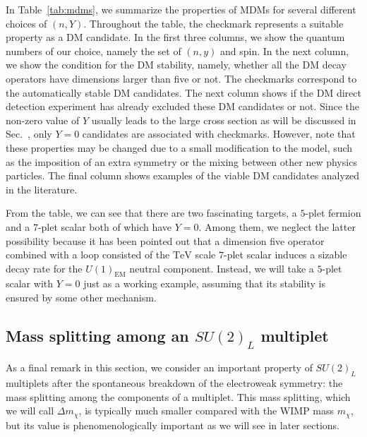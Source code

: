 \documentclass[12pt,twoside,book]{article}
\begin{document}
In Table~\ref{tab:mdms}, we summarize the properties of MDMs for several different choices of $(n, Y)$.
Throughout the table, the checkmark represents a suitable property as a DM candidate.
In the first three columns, we show the quantum numbers of our choice, namely the set of $(n,y)$ and spin.
In the next column, we show the condition for the DM stability, namely, whether all the DM decay operators have dimensions larger than five or not.
The checkmarks correspond to the automatically stable DM candidates.
The next column shows if the DM direct detection experiment has already excluded these DM candidates or not.
Since the non-zero value of $Y$ usually leads to the large cross section as will be discussed in Sec.~, only $Y=0$ candidates are associated with checkmarks.
However, note that these properties may be changed due to a small modification to the model, such as the imposition of an extra symmetry or the mixing between other new physics particles.
The final column shows examples of the viable DM candidates analyzed in the literature.

From the table, we can see that there are two fascinating targets, a $5$-plet fermion and a $7$-plet scalar both of which have $Y=0$.
Among them, we neglect the latter possibility because it has been pointed out \cite{DiLuzio:2015oha, DelNobile:2015bqo} that a dimension five operator combined with a loop consisted of the $\mathrm{TeV}$ scale $7$-plet scalar induces a sizable decay rate for the $U(1)_{\mathrm{EM}}$ neutral component.
Instead, we will take a $5$-plet scalar with $Y=0$ just as a working example, assuming that its stability is ensured by some other mechanism.


\subsection{Mass splitting among an $SU(2)_L$ multiplet}
\label{sec:mass_splitting}

As a final remark in this section, we consider an important property of $SU(2)_L$ multiplets after the spontaneous breakdown of the electroweak symmetry: the mass splitting among the components of a multiplet.
This mass splitting, which we will call $\Delta m_\chi$, is typically much smaller compared with the WIMP mass $m_\chi$, but its value is phenomenologically important as we will see in later sections.
\end{document}
